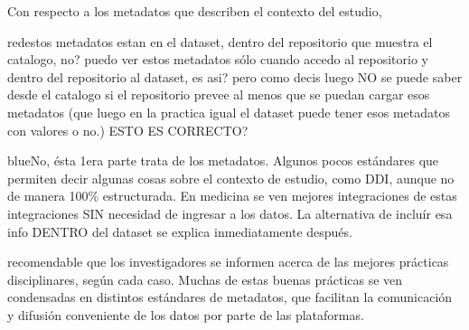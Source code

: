 \documentclass[runningheads]{llncs}
\def \bchregi {\begin{color}{red}}
\def \echregi {\end{color}}
\def \bchgon {\begin{color}{blue}}
\def \echgon {\end{color}}
\begin{document}





Con respecto a los metadatos que describen el contexto del estudio,
\bchregi estos metadatos estan en el dataset, dentro del repositorio que muestra el catalogo, no?  puedo ver estos metadatos sólo cuando accedo al repositorio y dentro del repositorio al dataset, es asi? pero como decis luego NO se puede saber desde el catalogo si el repositorio prevee al menos que se puedan cargar esos metadatos (que luego en la practica igual el dataset  puede tener esos metadatos con valores  o no.) ESTO ES CORRECTO?
\echregi
\bchgon No, ésta 1era parte trata de los metadatos. Algunos pocos estándares que permiten decir algunas cosas sobre el contexto de estudio, como DDI, aunque no de manera 100\% estructurada. En medicina se ven mejores integraciones de estas integraciones SIN necesidad de ingresar a los datos. La alternativa de incluír esa info DENTRO del dataset se explica inmediatamente después.
\echgon
recomendable que los investigadores se informen acerca de las mejores prácticas disciplinares, según cada caso. Muchas de estas buenas prácticas se ven condensadas en distintos estándares de metadatos, que facilitan la comunicación y difusión conveniente de los datos por parte de las plataformas. 
\end{document}
